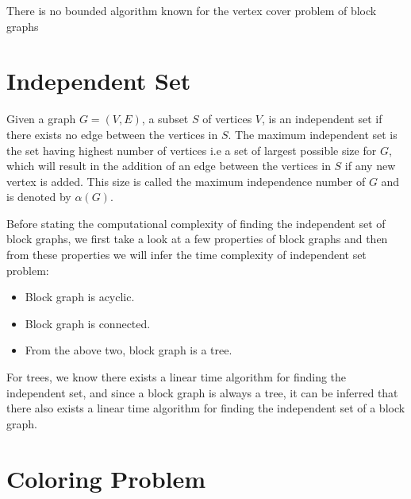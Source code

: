 \documentclass{memoir}
\begin{document}
There is no bounded algorithm known for the vertex cover problem of block graphs
\section*{Independent Set}

Given a graph $G=(V, E)$, a subset $S$ of vertices $V$, is an independent set if there exists no edge between the vertices in $S$. The maximum independent set is the set having highest number of vertices i.e a set of largest possible size for $G$, which will result in the addition of an edge between the vertices in $S$ if any new vertex is added. This size is called the maximum independence number of $G$ and is denoted by \begin{math} \alpha (G) \end{math}.

Before stating the computational complexity of finding
the independent set of block graphs, we first take a look at a few properties of block graphs and then from these properties we will infer the time complexity of independent set problem:
\begin{itemize}[noitemsep]
  \item Block graph is acyclic.
  \item Block graph is connected.
  \item From the above two, block graph is a tree.
\end{itemize}

For trees, we know there exists a linear time algorithm for finding the independent set, and since a block graph is always a tree, it can be inferred that there also exists a linear time algorithm for finding the independent set of a block graph.
\\

\section*{Coloring Problem}
\end{document}
